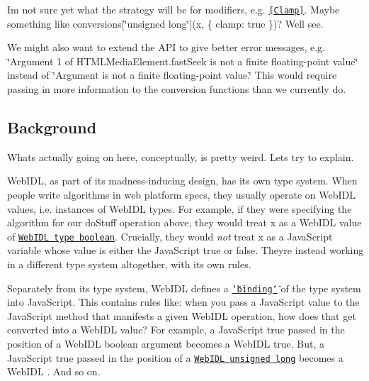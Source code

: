 I\textquotesingle{}m not sure yet what the strategy will be for modifiers, e.\+g. \href{http://heycam.github.io/webidl/#Clamp}{\tt {\ttfamily \mbox{[}Clamp\mbox{]}}}. Maybe something like {\ttfamily conversions\mbox{[}\char`\"{}unsigned long\char`\"{}\mbox{]}(x, \{ clamp\+: true \})}? We\textquotesingle{}ll see.

We might also want to extend the A\+PI to give better error messages, e.\+g. \char`\"{}\+Argument 1 of H\+T\+M\+L\+Media\+Element.\+fast\+Seek is not a finite floating-\/point value\char`\"{} instead of \char`\"{}\+Argument is not a finite floating-\/point value.\char`\"{} This would require passing in more information to the conversion functions than we currently do.

\subsection*{Background}

What\textquotesingle{}s actually going on here, conceptually, is pretty weird. Let\textquotesingle{}s try to explain.

Web\+I\+DL, as part of its madness-\/inducing design, has its own type system. When people write algorithms in web platform specs, they usually operate on Web\+I\+DL values, i.\+e. instances of Web\+I\+DL types. For example, if they were specifying the algorithm for our {\ttfamily do\+Stuff} operation above, they would treat {\ttfamily x} as a Web\+I\+DL value of \href{http://heycam.github.io/webidl/#idl-boolean}{\tt Web\+I\+DL type {\ttfamily boolean}}. Crucially, they would {\itshape not} treat {\ttfamily x} as a Java\+Script variable whose value is either the Java\+Script {\ttfamily true} or {\ttfamily false}. They\textquotesingle{}re instead working in a different type system altogether, with its own rules.

Separately from its type system, Web\+I\+DL defines a \href{http://heycam.github.io/webidl/#ecmascript-binding}{\tt \char`\"{}binding\char`\"{}} of the type system into Java\+Script. This contains rules like\+: when you pass a Java\+Script value to the Java\+Script method that manifests a given Web\+I\+DL operation, how does that get converted into a Web\+I\+DL value? For example, a Java\+Script {\ttfamily true} passed in the position of a Web\+I\+DL {\ttfamily boolean} argument becomes a Web\+I\+DL {\ttfamily true}. But, a Java\+Script {\ttfamily true} passed in the position of a \href{http://heycam.github.io/webidl/#idl-unsigned-long}{\tt Web\+I\+DL {\ttfamily unsigned long}} becomes a Web\+I\+DL {}. And so on.

